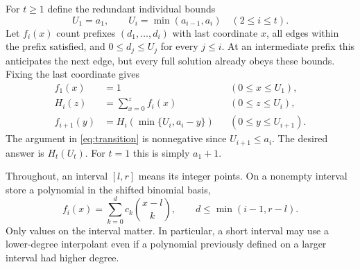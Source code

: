 \documentclass[11pt]{article}
\theoremstyle{remark}
\begin{document}
For $t\geq1$ define the redundant individual bounds
\[
 U_1=a_1,\qquad U_i=\min(a_{i-1},a_i)\quad(2\leq i\leq t).
\]
Let $f_i(x)$ count prefixes $(d_1,\ldots,d_i)$ with last coordinate
$x$, all edges within the prefix satisfied, and
$0\leq d_j\leq U_j$ for every $j\leq i$. At an intermediate prefix
this anticipates the next edge, but every full solution already obeys
these bounds. Fixing the last coordinate gives
\begin{align}
 f_1(x)&=1 &&(0\leq x\leq U_1),\label{eq:initial}\\
 H_i(z)&=\sum_{x=0}^z f_i(x) &&(0\leq z\leq U_i),\label{eq:prefix}\\
 f_{i+1}(y)&=H_i(\min\{U_i,a_i-y\})
 &&(0\leq y\leq U_{i+1}).\label{eq:transition}
\end{align}
The argument in \eqref{eq:transition} is nonnegative since
$U_{i+1}\leq a_i$. The desired answer is $H_t(U_t)$.
For $t=1$ this is simply $a_1+1$.

Throughout, an interval $[l,r]$ means its integer points. On a
nonempty interval store a polynomial in the shifted binomial basis,
\begin{equation}\label{eq:piece}
 f_i(x)=\sum_{k=0}^{d}c_k\binom{x-l}{k},\qquad
 d\leq\min(i-1,r-l).
\end{equation}
Only values on the interval matter. In particular, a short interval
may use a lower-degree interpolant even if a polynomial previously
defined on a larger interval had higher degree.
\end{document}

